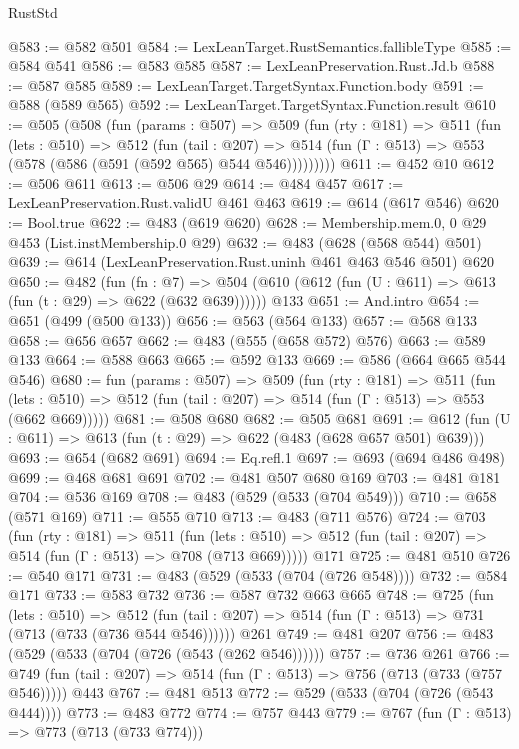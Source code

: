 \begin{lexlean}{RustStd}
\begin{coremodule}
{\begin{coremodule}
{{{{{@583 := @582 @501
@584 := LexLeanTarget.RustSemantics.fallibleType
@585 := @584 @541
@586 := @583 @585
@587 := LexLeanPreservation.Rust.Jd.b
@588 := @587 @585
@589 := LexLeanTarget.TargetSyntax.Function.body
@591 := @588 (@589 @565)
@592 := LexLeanTarget.TargetSyntax.Function.result
@610 := @505
    (@508
      (fun (params : @507) =>
      @509
        (fun (rty : @181) =>
        @511
          (fun (lets : @510) =>
          @512
            (fun (tail : @207) =>
            @514 (fun (Γ : @513) => @553 (@578 (@586 (@591 (@592 @565) @544 @546)))))))))
@611 := @452 @10
@612 := @506 @611
@613 := @506 @29
@614 := @484 @457
@617 := LexLeanPreservation.Rust.validU @461 @463
@619 := @614 (@617 @546)
@620 := Bool.true
@622 := @483 (@619 @620)
@628 := Membership.mem.{0, 0} @29 @453 (List.instMembership.{0} @29)
@632 := @483 (@628 (@568 @544) @501)
@639 := @614 (LexLeanPreservation.Rust.uninh @461 @463 @546 @501) @620
@650 := @482
    (fun (fn : @7) =>
    @504 (@610 (@612 (fun (U : @611) => @613 (fun (t : @29) => @622 (@632 @639))))))
    @133
@651 := And.intro
@654 := @651 (@499 (@500 @133))
@656 := @563 (@564 @133)
@657 := @568 @133
@658 := @656 @657
@662 := @483 (@555 (@658 @572) @576)
@663 := @589 @133
@664 := @588 @663
@665 := @592 @133
@669 := @586 (@664 @665 @544 @546)
@680 := fun (params : @507) =>
  @509
    (fun (rty : @181) =>
    @511
      (fun (lets : @510) => @512 (fun (tail : @207) => @514 (fun (Γ : @513) => @553 (@662 @669)))))
@681 := @508 @680
@682 := @505 @681
@691 := @612 (fun (U : @611) => @613 (fun (t : @29) => @622 (@483 (@628 @657 @501) @639)))
@693 := @654 (@682 @691)
@694 := Eq.refl.{1}
@697 := @693 (@694 @486 @498)
@699 := @468 @681 @691
@702 := @481 @507 @680 @169
@703 := @481 @181
@704 := @536 @169
@708 := @483 (@529 (@533 (@704 @549)))
@710 := @658 (@571 @169)
@711 := @555 @710
@713 := @483 (@711 @576)
@724 := @703
    (fun (rty : @181) =>
    @511
      (fun (lets : @510) => @512 (fun (tail : @207) => @514 (fun (Γ : @513) => @708 (@713 @669)))))
    @171
@725 := @481 @510
@726 := @540 @171
@731 := @483 (@529 (@533 (@704 (@726 @548))))
@732 := @584 @171
@733 := @583 @732
@736 := @587 @732 @663 @665
@748 := @725
    (fun (lets : @510) =>
    @512 (fun (tail : @207) => @514 (fun (Γ : @513) => @731 (@713 (@733 (@736 @544 @546))))))
    @261
@749 := @481 @207
@756 := @483 (@529 (@533 (@704 (@726 (@543 (@262 @546))))))
@757 := @736 @261
@766 := @749 (fun (tail : @207) => @514 (fun (Γ : @513) => @756 (@713 (@733 (@757 @546))))) @443
@767 := @481 @513
@772 := @529 (@533 (@704 (@726 (@543 @444))))
@773 := @483 @772
@774 := @757 @443
@779 := @767 (fun (Γ : @513) => @773 (@713 (@733 @774)))
}}}}}
\end{coremodule}}
\end{coremodule}
\end{lexlean}
